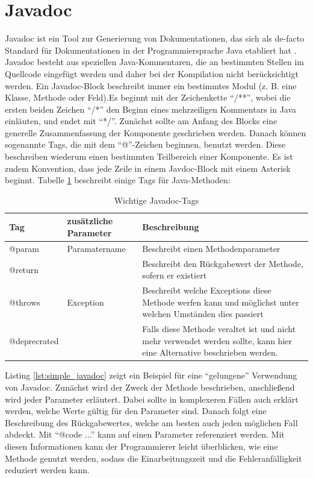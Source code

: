 \section{Javadoc}
Javadoc \cite{Javadoc} ist ein Tool zur Generierung von Dokumentationen, das sich als de-facto Standard für Dokumentationen in der Programmiersprache Java etabliert hat \cite[S. 249]{JavadocViolationsandTheirEvolutioninOpen-SourceSoftware}.  Javadoc besteht aus speziellen Java-Kommentaren, die an bestimmten Stellen im Quellcode eingefügt werden und daher bei der Kompilation nicht berücksichtigt werden. Ein Javadoc-Block beschreibt immer ein bestimmtes Modul (z. B. eine Klasse, Methode oder Feld).Es beginnt mit der Zeichenkette \enquote{/**}, wobei die ersten beiden Zeichen \enquote{/*} den Beginn eines mehrzeiligen Kommentars in Java einläuten, und endet mit \enquote{*/}. Zunächst sollte am Anfang des Blocks eine generelle Zusammenfassung der Komponente geschrieben werden. Danach können sogenannte Tags, die mit dem \enquote{@}-Zeichen beginnen, benutzt werden. Diese beschreiben wiederum einen bestimmten Teilbereich einer Komponente. Es ist zudem Konvention, dass jede Zeile in einem Javdoc-Block mit einem Asterisk beginnt. Tabelle \ref{tab:table_javadoc_method} beschreibt einige Tags für Java-Methoden:
\begin{table}[h]
    \centering
    \begin{tabular}{m{4cm}|m{4cm}|m{7cm}}
    Tag & zusätzliche Parameter &Beschreibung\\
    \hline
        @param  & Paramatername & Beschreibt einen Methodenparameter\\
        \hline
         @return & & Beschreibt den Rückgabewert der Methode, sofern er existiert \\
         \hline
         @throws &Exception & Beschreibt welche Exceptions diese Methode werfen kann und möglichst unter welchen Umständen dies passiert \\
           \hline
         @deprecrated & & Falls diese Methode veraltet ist und nicht mehr verwendet werden sollte, kann hier eine Alternative beschrieben werden. \\
           \hline
         
           \hline
         
         
         
         
    \end{tabular}
    \caption{Wichtige Javadoc-Tags}
    \label{tab:table_javadoc_method}
\end{table}
Listing \ref{lst:simple_javadoc} zeigt ein Beispiel für eine  \enquote{gelungene} Verwendung von Javadoc. Zunächst wird der Zweck der Methode beschrieben, anschließend wird jeder Parameter erläutert. Dabei sollte in komplexeren Fällen auch erklärt werden, welche Werte gültig für den Parameter sind. Danach folgt eine Beschreibung des Rückgabewertes, welche am besten auch jeden möglichen Fall abdeckt. Mit \enquote{{@code ...}} kann auf einen Parameter referenziert werden. Mit diesen Informationen kann der Programmierer leicht überblicken, wie eine Methode genutzt werden, sodass die Einarbeitungszeit und die Fehleranfälligkeit reduziert werden kann.  
